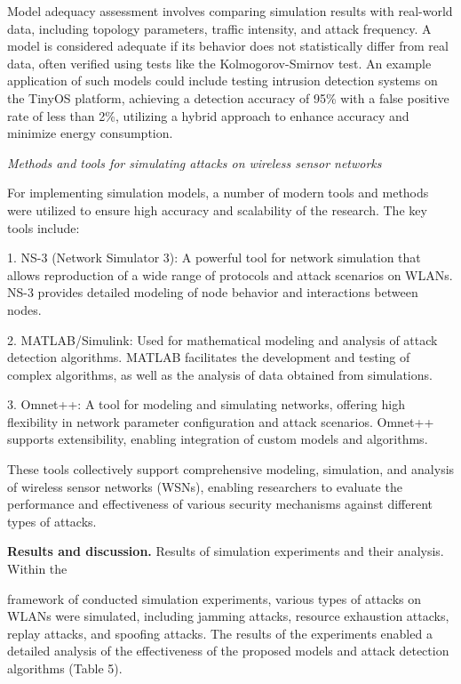 \begin{multicols}{2}

Model adequacy assessment involves comparing simulation results with
real-world data, including topology parameters, traffic intensity, and
attack frequency. A model is considered adequate if its behavior does
not statistically differ from real data, often verified using tests like
the Kolmogorov-Smirnov test. An example application of such models could
include testing intrusion detection systems on the TinyOS platform,
achieving a detection accuracy of 95\% with a false positive rate of
less than 2\%, utilizing a hybrid approach to enhance accuracy and
minimize energy consumption.

\emph{Methods and tools for simulating attacks on wireless sensor
networks}

For implementing simulation models, a number of modern tools and methods
were utilized to ensure high accuracy and scalability of the research.
The key tools include:

1. NS-3 (Network Simulator 3): A powerful tool for network simulation
that allows reproduction of a wide range of protocols and attack
scenarios on WLANs. NS-3 provides detailed modeling of node behavior and
interactions between nodes.

2. MATLAB/Simulink: Used for mathematical modeling and analysis of
attack detection algorithms. MATLAB facilitates the development and
testing of complex algorithms, as well as the analysis of data obtained
from simulations.

3. Omnet++: A tool for modeling and simulating networks, offering high
flexibility in network parameter configuration and attack scenarios.
Omnet++ supports extensibility, enabling integration of custom models
and algorithms.

These tools collectively support comprehensive modeling, simulation, and
analysis of wireless sensor networks (WSNs), enabling researchers to
evaluate the performance and effectiveness of various security
mechanisms against different types of attacks.

{\bfseries Results and discussion.} Results of simulation experiments and
their analysis. Within the

framework of conducted simulation experiments, various types of attacks
on WLANs were simulated, including jamming attacks, resource exhaustion
attacks, replay attacks, and spoofing attacks. The results of the
experiments enabled a detailed analysis of the effectiveness of the
proposed models and attack detection algorithms (Table 5).
\end{multicols}



